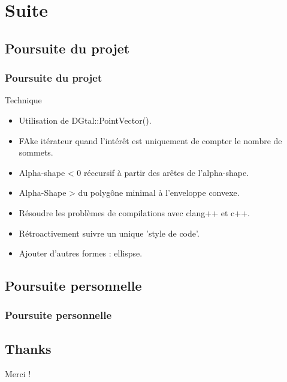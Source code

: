 \documentclass{beamer}
\begin{document}
\section{Suite}

\subsection{Poursuite du projet}
\begin{frame}
\frametitle{Poursuite du projet}

  \begin{block}{ Technique }
    \begin{itemize}
      \item Utilisation de DGtal::PointVector().
      \item FAke itérateur quand l'intérêt est uniquement de compter le nombre de sommets.
      \item Alpha-shape < 0 réccursif à partir des arêtes de l'alpha-shape.
      \item Alpha-Shape > du polygône minimal à l'enveloppe convexe.
      \item Résoudre les problèmes de compilations avec clang++ et c++.
      \item Rétroactivement suivre un unique 'style de code'.
      \item Ajouter d'autres formes : ellispse.
  \end{itemize} 
  \end{block}
\end{frame}

\subsection{Poursuite personnelle}
\begin{frame}
\frametitle{Poursuite personnelle}


\end{frame}

\subsection{Thanks}
\begin{frame}
  \begin{block}{}
    \begin{center}
      Merci !
    \end{center}
  \end{block}
\end{frame}

\end{document}
